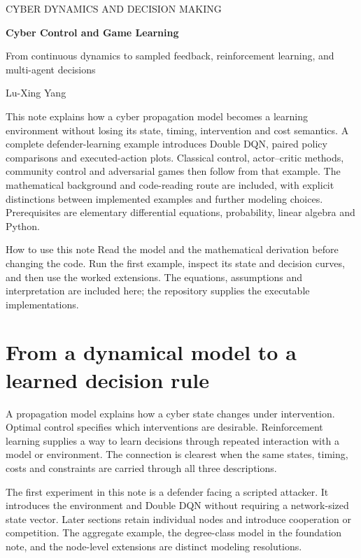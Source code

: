 \documentclass[11pt,a4paper]{article}
\theoremstyle{definition}
\theoremstyle{remark}
\begin{document}
\thispagestyle{plain}
{\color{inkblue}\sffamily\small CYBER DYNAMICS AND DECISION MAKING}\par
\vspace{1.0cm}
{\huge\bfseries Cyber Control and Game Learning}\par
\vspace{0.35cm}
{\Large From continuous dynamics to sampled feedback, reinforcement learning, and multi-agent decisions}\par
\vspace{0.45cm}
{\large Lu-Xing Yang}\par
\vspace{0.7cm}
This note explains how a cyber propagation model becomes a learning environment without losing its state, timing, intervention and cost semantics. A complete defender-learning example introduces Double DQN, paired policy comparisons and executed-action plots. Classical control, actor--critic methods, community control and adversarial games then follow from that example. The mathematical background and code-reading route are included, with explicit distinctions between implemented examples and further modeling choices. Prerequisites are elementary differential equations, probability, linear algebra and Python.
\vspace{0.5cm}
\begin{keyidea}{How to use this note}
Read the model and the mathematical derivation before changing the code. Run the first example, inspect its state and decision curves, and then use the worked extensions. The equations, assumptions and interpretation are included here; the repository supplies the executable implementations.
\end{keyidea}
\clearpage
\begingroup\setlength{\parskip}{0pt}\footnotesize\tableofcontents\endgroup
\clearpage

\section{From a dynamical model to a learned decision rule}
A propagation model explains how a cyber state changes under intervention. Optimal control specifies which interventions are desirable. Reinforcement learning supplies a way to learn decisions through repeated interaction with a model or environment. The connection is clearest when the same states, timing, costs and constraints are carried through all three descriptions.

The first experiment in this note is a defender facing a scripted attacker. It introduces the environment and Double DQN without requiring a network-sized state vector. Later sections retain individual nodes and introduce cooperation or competition. The aggregate example, the degree-class model in the foundation note, and the node-level extensions are distinct modeling resolutions.
\end{document}
